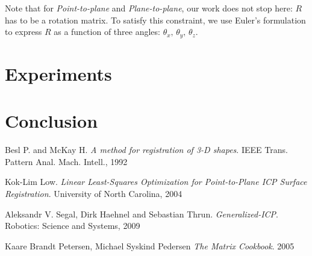 \documentclass[11pt,letterpaper,leqno]{article}
\begin{document}
Note that for \textit{Point-to-plane} and \textit{Plane-to-plane}, our work does not stop here: $R$ has to be a rotation matrix. To satisfy this constraint, we use Euler's formulation to express $R$ as a function of three angles: $\theta_x, \, \theta_y, \, \theta_z$.



\section{Experiments}

\section{Conclusion}

\break

\begin{thebibliography}{9}

    Besl P. and McKay H.
    \textit{A method for registration of 3-D shapes}. 
    IEEE Trans. Pattern Anal. Mach. Intell., 1992

    Kok-Lim Low.
    \textit{Linear Least-Squares Optimization for
    Point-to-Plane ICP Surface Registration}. 
    University of North Carolina, 2004

    Aleksandr V. Segal, Dirk Haehnel and Sebastian Thrun.
    \textit{Generalized-ICP}. 
    Robotics: Science and Systems, 2009

    Kaare Brandt Petersen, Michael Syskind Pedersen
    \textit{The Matrix Cookbook}. 2005

\end{thebibliography}
\end{document}
